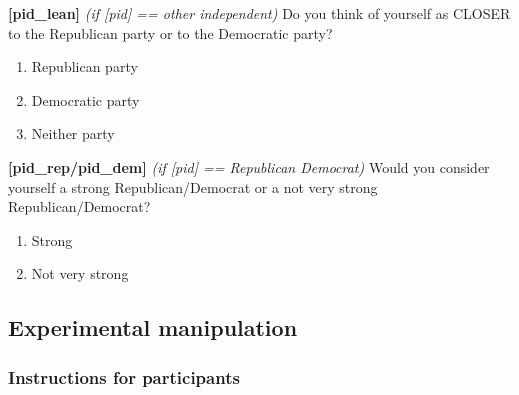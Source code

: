\documentclass[]{article}
\providecommand{\tightlist}{%
  \setlength{\itemsep}{0pt}\setlength{\parskip}{0pt}}
\begin{document}
\textbf{{[}pid\_lean{]}} \emph{(if {[}pid{]} == other \textbar{}
independent)} Do you think of yourself as CLOSER to the Republican party
or to the Democratic party?

\begin{enumerate}
\def\labelenumi{\arabic{enumi}.}
\tightlist
\item
  Republican party
\item
  Democratic party
\item
  Neither party
\end{enumerate}

\textbf{{[}pid\_rep/pid\_dem{]}} \emph{(if {[}pid{]} == Republican
\textbar{} Democrat)} Would you consider yourself a strong
Republican/Democrat or a not very strong Republican/Democrat?

\begin{enumerate}
\def\labelenumi{\arabic{enumi}.}
\tightlist
\item
  Strong
\item
  Not very strong
\end{enumerate}

\hypertarget{experimental-manipulation}{%
\subsection{Experimental manipulation}\label{experimental-manipulation}}

\hypertarget{instructions-for-participants}{%
\subsubsection{Instructions for
participants}\label{instructions-for-participants}}
\end{document}
